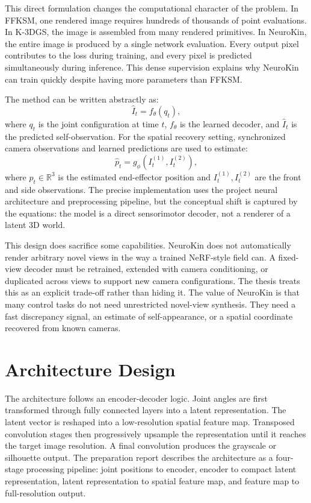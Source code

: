 \documentclass[12pt,a4paper,oneside]{report}
\begin{document}
This direct formulation changes the computational character of the problem. In FFKSM, one rendered image requires hundreds of thousands of point evaluations. In K-3DGS, the image is assembled from many rendered primitives. In NeuroKin, the entire image is produced by a single network evaluation. Every output pixel contributes to the loss during training, and every pixel is predicted simultaneously during inference. This dense supervision explains why NeuroKin can train quickly despite having more parameters than FFKSM.

The method can be written abstractly as:
\[
  \hat{I}_t = f_{\theta}(q_t),
\]
where $q_t$ is the joint configuration at time $t$, $f_{\theta}$ is the learned decoder, and $\hat{I}_t$ is the predicted self-observation. For the spatial recovery setting, synchronized camera observations and learned predictions are used to estimate:
\[
  \hat{p}_t = g_{\phi}(I^{(1)}_t, I^{(2)}_t),
\]
where $\hat{p}_t \in \mathbb{R}^3$ is the estimated end-effector position and $I^{(1)}_t, I^{(2)}_t$ are the front and side observations. The precise implementation uses the project neural architecture and preprocessing pipeline, but the conceptual shift is captured by the equations: the model is a direct sensorimotor decoder, not a renderer of a latent 3D world.

This design does sacrifice some capabilities. NeuroKin does not automatically render arbitrary novel views in the way a trained NeRF-style field can. A fixed-view decoder must be retrained, extended with camera conditioning, or duplicated across views to support new camera configurations. The thesis treats this as an explicit trade-off rather than hiding it. The value of NeuroKin is that many control tasks do not need unrestricted novel-view synthesis. They need a fast discrepancy signal, an estimate of self-appearance, or a spatial coordinate recovered from known cameras.

\section{Architecture Design}

The architecture follows an encoder-decoder logic. Joint angles are first transformed through fully connected layers into a latent representation. The latent vector is reshaped into a low-resolution spatial feature map. Transposed convolution stages then progressively upsample the representation until it reaches the target image resolution. A final convolution produces the grayscale or silhouette output. The preparation report describes the architecture as a four-stage processing pipeline: joint positions to encoder, encoder to compact latent representation, latent representation to spatial feature map, and feature map to full-resolution output.
\end{document}
